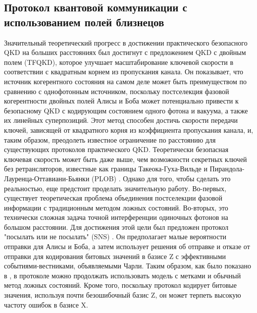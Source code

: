 \subsection {Протокол квантовой коммуникации с использованием полей близнецов}\label{sec:ch1/sect2/TF QKD lit}
Значительный теоретический прогресс в достижении практического безопасного QKD на больших расстояниях был достигнут с предложением QKD с двойным полем (TFQKD)\cite{scarani2009}, которое улучшает масштабирование ключевой скорости в соответствии с квадратным корнем из пропускания канала. Он показывает, что источник когерентного состояния на самом деле может быть преимуществом по сравнению с однофотонным источником, поскольку постселекция фазовой когерентности двойных полей Алисы и Боба может потенциально привести к безопасному QKD с кодирующим состоянием одного фотона и вакуума, а также их линейных суперпозиций. Этот метод способен достичь скорости передачи ключей, зависящей от квадратного корня из коэффициента пропускания канала, и, таким образом, преодолеть известное ограничение по расстоянию для существующих протоколов практического QKD. Теоретически безопасная ключевая скорость может быть даже выше, чем возможности секретных ключей без ретрансляторов, известные как границы Такеока-Гуха-Вильде \cite{takeoka2014} и Пирандола-Лауренца-Оттавиани-Бьянки (PLOB) \cite{pirandola2017}. Однако для того, чтобы сделать это реальностью, еще предстоит проделать значительную работу. Во-первых, существует теоретическая проблема объединения постселекции фазовой информации с традиционным методом ложных состояний. Во-вторых, это технически сложная задача точной интерференции одиночных фотонов на большом расстоянии. Для достижения этой цели был предложен протокол "посылать или не посылать" (SNS) \cite{wang2018}. Он предполагает малые вероятности отправки для Алисы и Боба, а затем использует решения об отправке и отказе от отправки для кодирования битовых значений в базисе Z с эффективными событиями-вестниками, объявляемыми Чарли. Таким образом, как было показано в \cite{wang2018}, в протоколе можно продолжать использовать модель с метками и обычный метод ложных состояний. Кроме того, поскольку протокол кодирует битовые значения, используя почти безошибочный базис Z, он может терпеть высокую частоту ошибок в базисе X. 

